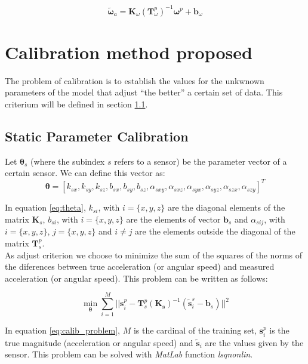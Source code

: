 \documentclass[conference]{IEEEtran}
\begin{document}
\begin{equation}
\tilde{\boldsymbol{\omega}}_a = \mathbf{K}_{\omega}(\mathbf{T}_{\omega}^p)^{-1}\boldsymbol{\omega}^p+\mathbf{b}_{\omega}
\end{equation}

\section{Calibration method proposed}
The problem of calibration is to establish the values for the unkwnown parameters of the model that adjust ``the better'' a certain set of data. This criterium will be defined in section \ref{sec:param}. 


\subsection{Static Parameter Calibration}
\label{sec:param}

Let $\boldsymbol{\theta}_s$ (where the subindex $s$ refers to a sensor) be the parameter vector of a certain sensor. We can define this vector as:
\begin{equation}
\boldsymbol{\theta} = [k_{sx},k_{sy},k_{sz},b_{sx},b_{sy},b_{sz}, \alpha_{sxy},\alpha_{sxz},\alpha_{syx},\alpha_{syz},\alpha_{szx},\alpha_{szy}]^T
\label{eq:theta}
\end{equation}

In equation \ref{eq:theta}, $k_{si}$, with $i=\{x, y, z\}$ are the diagonal elements of the matrix $\mathbf{K}_s$, $b_{si}$, with $i=\{x, y, z\}$ are the elements of vector $\mathbf{b}_s$ and $\alpha_{sij}$, with $i=\{x, y, z\}$, $j=\{x, y, z\}$ and $i \neq j$ are the elements outside the diagonal of the matrix $\mathbf{T}_s^p$.\\

As adjust criterion we choose to minimize the sum of the squares of the norms of the diferences between true acceleration (or angular speed) and measured acceleration (or angular speed). This problem can be written as follows:

\begin{equation}
\min_{\boldsymbol{\theta}} \sum_{i = 1}^M ||\mathbf{s}_i^p - \mathbf{T}_s^p(\mathbf{K_s})^{-1}(\tilde{\mathbf{s}}_i^s-\mathbf{b}_s) ||^2
\label{eq:calib_problem}
\end{equation}

In equation \ref{eq:calib_problem}, $M$ is the cardinal of the training set, $\mathbf{s}_i^p$ is the true magnitude (acceleration or angular speed) and $\tilde{\mathbf{s}}_i$ are the values given by the sensor. This problem can be solved with \emph{MatLab} function \emph{lsqnonlin}.\\
\end{document}
